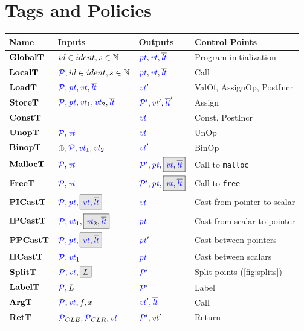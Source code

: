 \documentclass[acmsmall,review,anonymous]{acmart}\settopmatter{printfolios=true,printccs=false,printacmref=false}
\begin{document}
\section{Tags and Policies}

\begin{table}
  \begin{tabular}{|l|l|l|l|}
    \hline
    Name & Inputs & Outputs & Control Points \\
    \hline
    \(\globaltname\) & \(\globaltargstyped\) & \(\globaltres\)    & Program initialization \\
    \(\localtname\)  & \(\localtargstyped\)  & \(\localtres\)     & Call \\
    \(\loadtname\)   & \(\loadtargs\)        & \(\loadtres\)      & ValOf, AssignOp, PostIncr \\
    \(\storetname\)  & \(\storetargs\)       & \(\storetres\)     & Assign \\
    \(\consttname\)  &                       & \(\consttres\)     & Const, PostIncr \\
    \(\unoptname\)   & \(\unoptargs\)        & \(\unoptres\)      & UnOp \\
    \(\binoptname\)  & \(\binoptargs\)       & \(\binoptres\)     & BinOp \\
    \(\malloctname\) & \(\malloctargs\)      & \(\malloctres\)    & Call to {\tt malloc} \\
    \(\freetname\)   & \(\freetargs\)        & \(\freetres\)      & Call to {\tt free} \\
    \(\picasttname\) & \(\picasttargs\)      & \(\picasttres\)    & Cast from pointer to scalar \\
    \(\ipcasttname\) & \(\ipcasttargs\)      & \(\ipcasttres\)    & Cast from scalar to pointer \\
    \(\ppcasttname\) & \(\ppcasttargs\)      & \(\ppcasttres\)    & Cast between pointers \\
    \(\iicasttname\) & \(\iicasttargs\)      & \(\iicasttres\)    & Cast between scalars \\
    \(\splittname\)  & \(\splittargs\)       & \(\splittres\)     & Split points (\cref{fig:splits})\\
    \(\labeltname\)   & \(\labeltargs\)        & \(\labeltres\)      & Label \\
    \(\argtname\)    & \(\argtargs\)         & \(\argtres\)       & Call \\
    \(\rettname\)    & \(\rettargs\)         & \(\rettres\)       & Return \\
    \hline
  \end{tabular}

  \label{fig:controlpoints}
\end{table}
\end{document}
